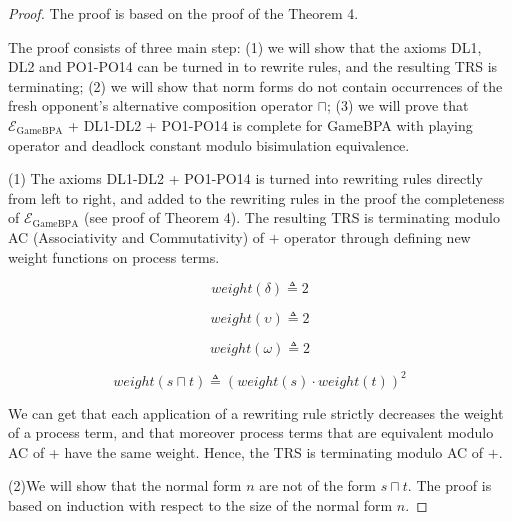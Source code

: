 \documentclass{fac}
\begin{document}
\begin{proof}
The proof is based on the proof of the Theorem 4.

The proof consists of three main step: (1) we will show that the axioms DL1, DL2 and PO1-PO14 can be turned in to rewrite rules, and the resulting TRS is terminating; (2) we will show that norm forms do not contain occurrences of the fresh opponent's alternative composition operator $\sqcap$; (3) we will prove that $\mathcal{E}_{\textrm{GameBPA}}$ + DL1-DL2 + PO1-PO14 is complete for GameBPA with playing operator and deadlock constant modulo bisimulation equivalence.

(1) The axioms DL1-DL2 + PO1-PO14 is turned into rewriting rules directly from left to right, and added to the rewriting rules in the proof the completeness of $\mathcal{E}_{\textrm{GameBPA}}$ (see proof of Theorem 4). The resulting TRS is terminating modulo AC (Associativity and Commutativity) of $+$ operator through defining new weight functions on process terms.

$$
weight(\delta)\triangleq 2
$$

$$
weight(\upsilon)\triangleq 2
$$

$$
weight(\omega)\triangleq 2
$$

$$
weight(s\sqcap t)\triangleq (weight(s) \cdot weight(t))^2
$$

We can get that each application of a rewriting rule strictly decreases the weight of a process term, and that moreover process terms that are equivalent modulo AC of + have the same weight. Hence, the TRS is terminating modulo AC of $+$.

(2)We will show that the normal form $n$ are not of the form $s\sqcap t$. The proof is based on induction with respect to the size of the normal form $n$.


\end{proof}
\end{document}
